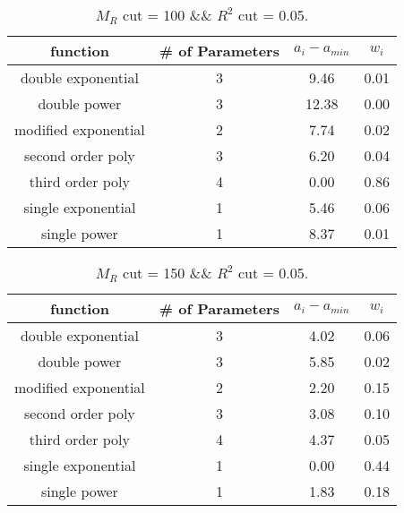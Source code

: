  
\begin{table}[H] 
\begin{center} 
\begin{tabular}{|c|c|c|c|} 
\hline function & \# of Parameters & $a_i-a_{min}$ & $w_i$ \\ \hline 
double exponential &  3 &   9.46 &   0.01 \\ 
double power &  3 &  12.38 &   0.00 \\ 
modified exponential &  2 &   7.74 &   0.02 \\ 
second order poly &  3 &   6.20 &   0.04 \\ 
third order poly &  4 &   0.00 &   0.86 \\ 
single exponential &  1 &   5.46 &   0.06 \\ 
single power &  1 &   8.37 &   0.01 \\ 
\hline 
\end{tabular} 
\caption{$M_R$ cut = 100 \&\& $R^2$ cut = 0.05.} 
\label{tab:FitChoices_100_0.05} 
\end{center} 
\end{table} 
 
 
\begin{table}[H] 
\begin{center} 
\begin{tabular}{|c|c|c|c|} 
\hline function & \# of Parameters & $a_i-a_{min}$ & $w_i$ \\ \hline 
double exponential &  3 &   4.02 &   0.06 \\ 
double power &  3 &   5.85 &   0.02 \\ 
modified exponential &  2 &   2.20 &   0.15 \\ 
second order poly &  3 &   3.08 &   0.10 \\ 
third order poly &  4 &   4.37 &   0.05 \\ 
single exponential &  1 &   0.00 &   0.44 \\ 
single power &  1 &   1.83 &   0.18 \\ 
\hline 
\end{tabular} 
\caption{$M_R$ cut = 150 \&\& $R^2$ cut = 0.05.} 
\label{tab:FitChoices_150_0.05} 
\end{center} 
\end{table} 
 
